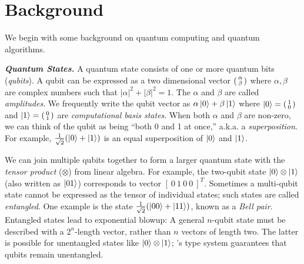 \section{Background}
\label{sec:background}

We begin with some background on quantum computing and quantum algorithms. 

\noindent\textbf{\textit{Quantum States.}} A quantum state consists of one or more quantum bits (\emph{qubits}). A qubit can be expressed as a two dimensional vector $\begin{psmallmatrix} \alpha \\ \beta \end{psmallmatrix}$ where $\alpha,\beta$ are complex numbers such that $|\alpha|^2 + |\beta|^2 = 1$.  The $\alpha$ and $\beta$ are called \emph{amplitudes}. 
%
We frequently write the qubit vector as $\alpha\ket{0} + \beta\ket{1}$ where $\ket{0} = \begin{psmallmatrix} 1 \\ 0 \end{psmallmatrix}$ and $\ket{1} = \begin{psmallmatrix} 0 \\ 1 \end{psmallmatrix}$ are \emph{computational basis states}. When both $\alpha$ and $\beta$ are non-zero, we can think of the qubit as being ``both 0 and 1 at once,'' a.k.a. a \emph{superposition}. For example, $\frac{1}{\sqrt{2}}(\ket{0} + \ket{1})$ is an equal superposition of $\ket{0}$ and $\ket{1}$. 

We can join multiple qubits together to form a larger quantum state with the \emph{tensor product} ($\otimes$) from linear algebra. For example, the two-qubit state $\ket{0} \otimes \ket{1}$ (also written as $\ket{01}$) corresponds to vector $[~0~1~0~0~]^T$. 
Sometimes a multi-qubit state cannot be expressed as the tensor of individual states; such states are called \emph{entangled}. One example is the state $\frac{1}{\sqrt{2}}(\ket{00} + \ket{11})$, known as a \emph{Bell pair}.
Entangled states lead to exponential blowup: A general $n$-qubit state must be described with a $2^n$-length vector, rather than $n$ vectors of length two. The latter is possible for unentangled states like $\ket{0} \otimes \ket{1}$; \vqir's type system guarantees that qubits remain unentangled.

